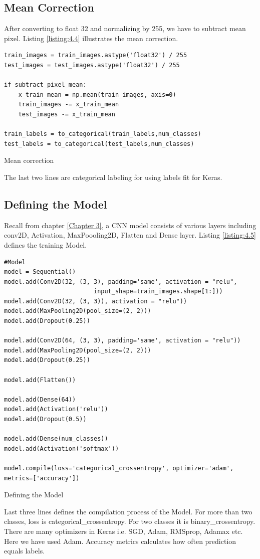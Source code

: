 \subsection{Mean Correction}
After converting to float 32 and normalizing by 255, we have to subtract mean pixel.
Listing \ref{listing:4.4} illustrates the mean correction.

\begin{listing}[H]
    \begin{verbatim}
train_images = train_images.astype('float32') / 255
test_images = test_images.astype('float32') / 255

if subtract_pixel_mean:
    x_train_mean = np.mean(train_images, axis=0)
    train_images -= x_train_mean
    test_images -= x_train_mean

train_labels = to_categorical(train_labels,num_classes)
test_labels = to_categorical(test_labels,num_classes)
    \end{verbatim}
    \caption{Mean correction}
\label{listing:4.4}
\end{listing}
\noindent The last two lines are categorical labeling for using labels fit for Keras.
\subsection{Defining the Model}
Recall from chapter \ref{Chapter 3}, a CNN model consists of various layers including
conv2D, Activation, MaxPoooling2D, Flatten and Dense layer. Listing \ref{listing:4.5}
defines the training Model.

\begin{longlisting}
    \begin{verbatim}
#Model
model = Sequential()
model.add(Conv2D(32, (3, 3), padding='same', activation = "relu",
                         input_shape=train_images.shape[1:]))
model.add(Conv2D(32, (3, 3)), activation = "relu"))
model.add(MaxPooling2D(pool_size=(2, 2)))
model.add(Dropout(0.25))   

model.add(Conv2D(64, (3, 3), padding='same', activation = "relu"))
model.add(MaxPooling2D(pool_size=(2, 2)))
model.add(Dropout(0.25)) 
     
model.add(Flatten())

model.add(Dense(64))
model.add(Activation('relu'))
model.add(Dropout(0.5)) 

model.add(Dense(num_classes))
model.add(Activation('softmax'))

model.compile(loss='categorical_crossentropy', optimizer='adam',
metrics=['accuracy'])
    \end{verbatim}
    \caption{Defining the Model}
\label{listing:4.5}
\end{longlisting}
Last three lines defines the compilation process of the Model. 
For more than two classes, loss is categorical\_crossentropy. For two
classes it is binary\_crossentropy. There are many optimizers in Keras i.e.
SGD, Adam, RMSprop, Adamax etc. Here we have used Adam. Accuracy metrics calculates how
often prediction equals labels.
